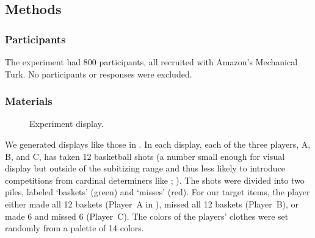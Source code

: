 \documentclass[leqno,12pt]{article}
\begin{document}

\subsection{Methods}


\subsubsection{Participants}

The experiment had 800 participants, all recruited with Amazon's
Mechanical Turk. No participants or responses were excluded.

\subsubsection{Materials}

\begin{figure}[t]
  \centering
  \caption{Experiment display.}
  \label{fig:binary:materials}
\end{figure}

We generated displays like those in . In
each display, each of the three players, A, B, and C, has taken 12
basketball shots (a number small enough for visual display but outside
of the subitizing range and thus less likely to introduce competitions
from cardinal determiners like ;
\citealt{Degen:Tanenhaus:2014}). The shots were divided into two
piles, labeled `baskets' (green) and `misses' (red).  For our target
items, the player either made all 12 baskets (Player~A in
), missed all 12 baskets (Player~B), or
made 6 and missed 6 (Player~C). The colors of the players' clothes
were set randomly from a palette of 14 colors.
\end{document}
